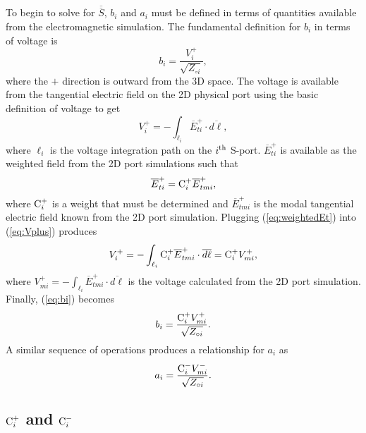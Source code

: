 \documentclass[titlepage]{article}
\renewcommand\_{\textunderscore\linebreak[1]}
\begin{document}
To begin to solve for $\overline{\overline{S}}$, $b_i$  and $a_i$ must be defined in terms of quantities available from the electromagnetic simulation.  The fundamental definition for $b_i$ in terms of voltage is
\begin{equation}
\label{eq:bi}
b_i=\frac{V_{i}^{+}}{\sqrt{Z_{\circ i}}},
\end{equation}
where the $+$ direction is outward from the 3D space.  The voltage is available from the tangential electric field on the 2D physical port using the basic definition of voltage to get
\begin{equation}
\label{eq:Vplus}
V_{i}^{+}=-\int_{\ell_i} \overline{E}_{ti}^{+}\cdot \overline{d\ell},
\end{equation}
where $\ell_i$ is the voltage integration path on the $i^{\textnormal{th}}$ S-port.  $\overline{E}_{ti}^{+}$ is available as the weighted field from the 2D port simulations such that 
\begin{equation}
\label{eq:weightedEt}
\overline{E}_{ti}^{+}=\textnormal{C}_{i}^{+}\overline{E}_{tmi}^{+},
\end{equation}
where $\textnormal{C}_{i}^{+}$ is a weight that must be determined and $\overline{E}_{tmi}^{+}$ is the modal tangential electric field known from the 2D port simulation. Plugging (\ref{eq:weightedEt}) into (\ref{eq:Vplus}) produces
\begin{equation}
V_{i}^{+}=-\int_{\ell_i} \textnormal{C}_{i}^{+}\overline{E}_{tmi}^{+}\cdot \overline{d\ell}=\textnormal{C}_{i}^{+}V_{mi}^{+},
\end{equation}
where $V_{mi}^{+}=-\int_{\ell_i}\overline{E}_{tmi}^{+}\cdot \overline{d\ell}$ is the voltage calculated from the 2D port simulation.  Finally, (\ref{eq:bi}) becomes
\begin{equation}
\label{eq:bifinal}
b_i=\frac{\textnormal{C}_{i}^{+}V_{mi}^{+}}{\sqrt{Z_{\circ i}}}.
\end{equation}
A similar sequence of operations produces a relationship for $a_i$ as
\begin{equation}
\label{eq:aifinal}
a_i=\frac{\textnormal{C}_{i}^{-}V_{mi}^{-}}{\sqrt{Z_{\circ i}}}.  
\end{equation}

\subsection{$\textnormal{C}_{i}^{+}$ and $\textnormal{C}_{i}^{-}$}
\label{sec:C}
\end{document}
